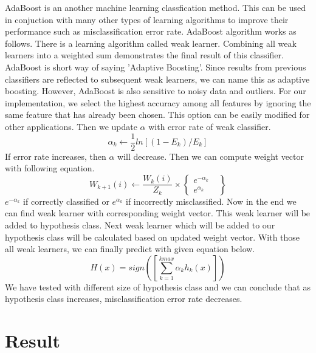 \documentclass[11pt,letterpaper]{article}
\begin{document}
AdaBoost is an another machine learning classfication method. This can be used in conjuction with many other types of learning algorithms to improve their performance such as misclassification error rate. AdaBoost algorithm works as follows. There is a learning algorithm called weak learner. Combining all weak learners into a weighted sum demonstrates the final result of this classifier. AdaBoost is short way of saying 'Adaptive Boosting'. Since results from previous classifiers are reflected to subsequent weak learners, we can name this as adaptive boosting. However, AdaBoost is also sensitive to noisy data and outliers. For our implementation, we select the highest accuracy among all features by ignoring the same feature that has already been chosen. This option can be easily modified for other applications. Then we update $\alpha$ with error rate of weak classifier. $$ \alpha_k \leftarrow \frac{1}{2} ln[(1-E_k)/E_k] $$ If error rate increases, then $\alpha$ will decrease.
Then we can compute weight vector with following equation. $$  W_{k+1}(i) \leftarrow \frac{W_k(i)}{Z_k} \times \left\{\begin{array}{lr} e^{-\alpha_{k}} &  \\ e^{\alpha_{k}} \end{array}\right\}   $$
$e^{-\alpha_{k}}$ if correctly classified or $e^{\alpha_{k}}$ if incorrectly misclassified. Now in the end we can find weak learner with corresponding weight vector. This weak learner will be added to hypothesis class. Next weak learner which will be added to our hypothesis class will be calculated based on updated weight vector. With those all weak learners, we can finally predict with given equation below. 
$$ H(x) = sign([ \sum_{k=1}^{kmax} \alpha_{k} h_{k} (x) ]) $$ We have tested with different size of hypothesis class and we can conclude that as hypothesis class increases, misclassification error rate decreases. 



\section{Result}
\label{sec:length}
\end{document}
